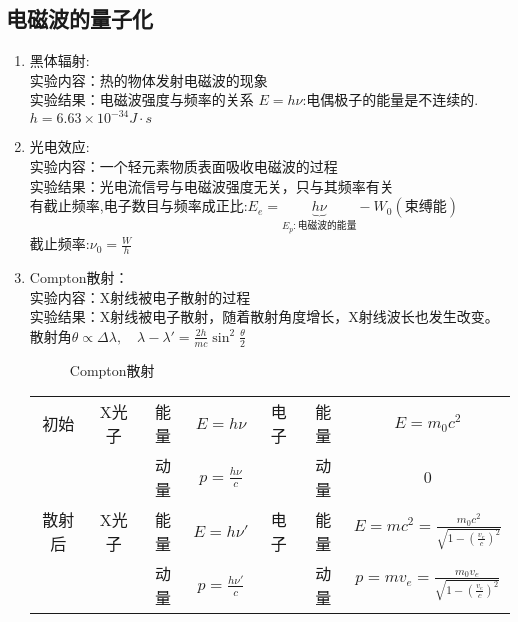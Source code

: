 \documentclass{article}
\renewcommand\var[1]{\Delta#1}
\begin{document}
\subsection{电磁波的量子化}
\begin{enumerate}[label=(\arabic*)]
	\item 黑体辐射:\\
				实验内容：热的物体发射电磁波的现象\\
				实验结果：电磁波强度与频率的关系
				$E=h\nu$:电偶极子的能量是不连续的.$h=6.63\times 10^{-34}\si{J\cdot s}$
	\item 光电效应:\\
				实验内容：一个轻元素物质表面吸收电磁波的过程\\
				实验结果：光电流信号与电磁波强度无关，只与其频率有关\\
				有截止频率,电子数目与频率成正比:$E_e=\underbrace{h\nu }_{E_p:\text{电磁波的能量}}-W_0(\text{束缚能})$\\
				截止频率:$\nu_0=\frac{W}{h}$
	\item Compton散射：\\
				实验内容：X射线被电子散射的过程\\
				实验结果：X射线被电子散射，随着散射角度增长，X射线波长也发生改变。散射角$\theta \propto \var\lambda,\quad \lambda-\lambda'=\frac{2h}{mc}\sin ^2 \frac{\theta}{2}$
				\begin{figure}[H]
					\centering
					\caption{Compton散射}
					\label{fig:Compton散射}
				\end{figure}
				\begin{tabular}{cccc|ccc}
					初始 & X光子 & 能量 & $E=h\nu$ & 电子 & 能量 & $E=m_0c^2$ \\
							&       & 动量 & $p=\frac{h\nu}{c}$ & & 动量 & $0$ \\
					散射后 & X光子 & 能量 & $E=h\nu'$ & 电子 & 能量 & $E=mc^2=\frac{m_0c^2}{\sqrt{1-(\frac{v_e}{c})^2}}$ \\
								&       & 动量 & $p=\frac{h\nu'}{c}$ & & 动量 & $p=mv_e=\frac{m_0v_e}{\sqrt{1-(\frac{v_e}{c})^2}}$ \\

\end{tabular}
\end{enumerate}
\end{document}
